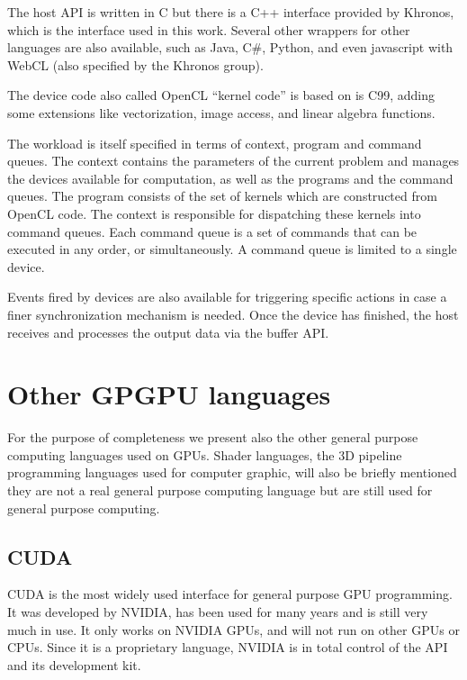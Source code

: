 The host \gls{API} is written in C but there is a C++ interface provided by Khronos, which is the interface used in this work. Several other wrappers for other languages are also available, such as Java, C\#, Python, and even javascript with WebCL (also specified by the Khronos group). 

The device code also called \gls{OpenCL} ``kernel code'' is based on is C99, adding some extensions like vectorization, image access, and linear algebra functions.

The workload is itself specified in terms of context, program and command queues. The context contains the parameters of the current problem and manages the devices available for computation, as well as the programs and the command queues. The program consists of the set of kernels which are constructed from \gls{OpenCL} code. The context is responsible for dispatching these kernels into command queues. Each command queue is a set of commands that can be executed in any order, or simultaneously. A command queue is limited to a single device.\cite{OpenCLInAction,OpenCLProgrammingGuide}

Events fired by devices are also available for triggering specific actions in case a finer synchronization mechanism is needed. Once the device has finished, the host receives and processes the output data via the buffer \gls{API}.

\section{Other GPGPU languages}

For the purpose of completeness we present also the other general purpose computing languages used on \glspl{GPU}. Shader languages, the 3D pipeline programming languages used for computer graphic, will also be briefly mentioned they are not a real general purpose computing language but are still used for general purpose computing.

\subsection{CUDA}

\Gls{CUDA} is the most widely used interface for general purpose \gls{GPU} programming. It was developed by NVIDIA, has been used for many years and is still very much in use. It only works on NVIDIA \glspl{GPU}, and will not run on other \glspl{GPU} or \glspl{CPU}. Since it is a proprietary language, NVIDIA is in total control of the API and its development kit.

